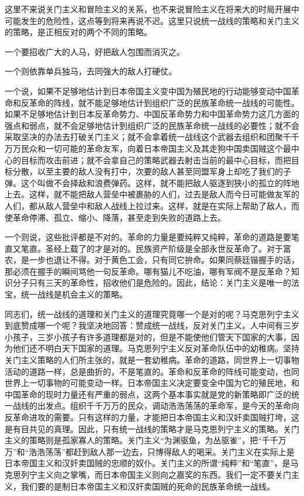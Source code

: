 这里不来说关门主义和冒险主义的关系，也不来说冒险主义在将来大的时局开展中可能发生的危险性，这点等到将来再说不迟。这里只说统一战线的策略和关门主义的策略，是正相反对的两个不同的策略。

一个要招收广大的人马，好把敌人包围而消灭之。

一个则依靠单兵独马，去同强大的敌人打硬仗。

一个说，如果不足够地估计到日本帝国主义变中国为殖民地的行动能够变动中国革命和反革命的阵线，就不能足够地估计到组织广泛的民族革命统一战线的可能性。如果不足够地估计到日本反革命势力、中国反革命势力和中国革命势力这几方面的强点和弱点，就不会足够地估计到组织广泛的民族革命统一战线的必要性；就不会采取坚决的办法去打破关门主义；就不会拿着统一战线这个武器去组织和团聚千千万万民众和一切可能的革命友军，向着日本帝国主义及其走狗中国卖国贼这个最中心的目标而攻击前进；就不会拿自己的策略武器去射击当前的最中心目标，而把目标分散，以至主要的敌人没有打中，次要的敌人甚至同盟军身上却吃了我们的子弹。这个叫做不会择敌和浪费弹药。这样，就不能把敌人驱逐到狭小的孤立的阵地上去。这样，就不能把敌人营垒中被裹胁的人们，过去是敌人而今日可能做友军的人们，都从敌人营垒中和敌人战线上拉过来。这样，就是在实际上帮助了敌人，而使革命停滞、孤立、缩小、降落，甚至走到失败的道路上去。

一个则说，这些批评都是不对的。革命的力量是要纯粹又纯粹，革命的道路是要笔直又笔直。圣经上载了的才是对的。民族资产阶级是全部永世反革命了。对于富农，是一步也退让不得。对于黄色工会，只有同它拚命。如果同蔡廷锴握手的话，那必须在握手的瞬间骂他一句反革命。哪有猫儿不吃油，哪有军阀不是反革命？知识分子只有三天的革命性，招收他们是危险的。因此，结论：关门主义是唯一的法宝，统一战线是机会主义的策略。

同志们，统一战线的道理和关门主义的道理究竟哪一个是对的呢？马克思列宁主义到底赞成哪一个呢？我坚决地回答：赞成统一战线，反对关门主义。人中间有三岁小孩子，三岁小孩子有许多道理都是对的，但是不能使他们管天下国家的大事，因为他们还不明白天下国家的道理。马克思列宁主义反对革命队伍中的幼稚病。坚持关门主义策略的人们所主张的，就是一套幼稚病。革命的道路，同世界上一切事物活动的道路一样，总是曲折的，不是笔直的。革命和反革命的阵线可能变动，也同世界上一切事物的可能变动一样。日本帝国主义决定要变全中国为它的殖民地，和中国革命的现时力量还有严重的弱点，这两个基本事实就是党的新策略即广泛的统一战线的出发点。组织千千万万的民众，调动浩浩荡荡的革命军，是今天的革命向反革命进攻的需要。只有这样的力量，才能把日本帝国主义和汉奸卖国贼打垮，这是有目共见的真理。因此，只有统一战线的策略才是马克思列宁主义的策略。关门主义的策略则是孤家寡人的策略。关门主义“为渊驱鱼，为丛驱雀”，把“千千万万”和“浩浩荡荡”都赶到敌人那一边去，只博得敌人的喝采。关门主义在实际上是日本帝国主义和汉奸卖国贼的忠顺的奴仆。关门主义的所谓“纯粹”和“笔直”，是马克思列宁主义向之掌嘴，而日本帝国主义则向之嘉奖的东西。我们一定不要关门主义，我们要的是制日本帝国主义和汉奸卖国贼的死命的民族革命统一战线。


